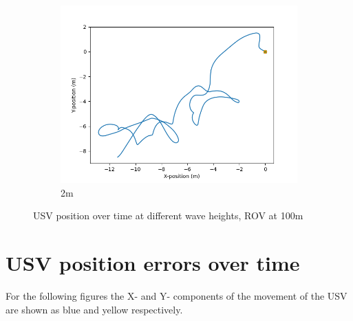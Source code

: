 \documentclass[class=article, crop=false]{standalone}
\begin{document}
\begin{figure}
\begin{subfigure}[b]{0.48\textwidth}
        \includegraphics{scenario1/rov-100m/2.0m/usv_position_controlled}
        \caption{2m}
        \label{}
    \end{subfigure}

    \caption{USV position over time at different wave heights, ROV at 100m}
\end{figure}

\section{USV position errors over time}
For the following figures the X- and Y- components of the movement of the USV are shown as blue and yellow respectively.
\end{document}
